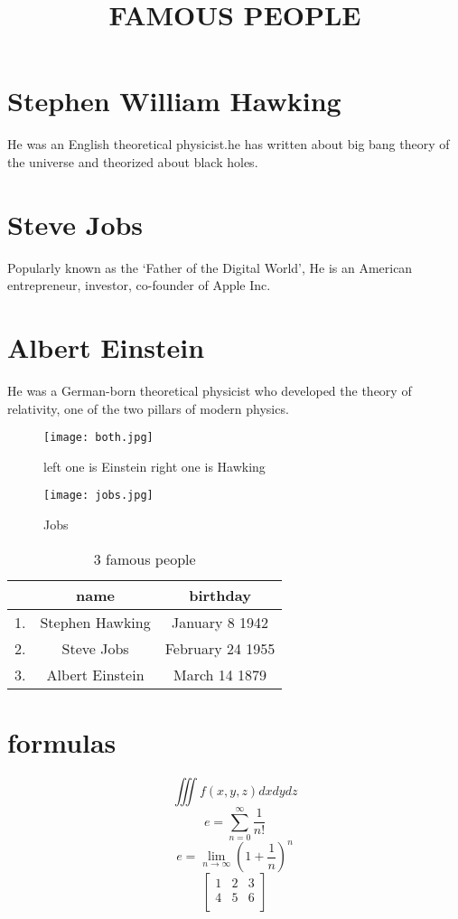 \documentclass[12pt]{article}
\begin{document}
\title{FAMOUS PEOPLE}
\maketitle

\section{Stephen William Hawking} 
He was an English theoretical physicist.he has written about big bang theory of the universe and theorized about black holes.

\section{Steve Jobs}
Popularly known as the ‘Father of the Digital World’, He is an American entrepreneur, investor, co-founder of Apple Inc. 
\section{Albert Einstein} He was a German-born theoretical physicist who developed the theory of relativity, one of the two pillars of modern physics.
\begin{figure}
\texttt{[image: both.jpg]}
\caption{left one is Einstein right one is Hawking}
\end{figure}
\begin{figure}

\texttt{[image: jobs.jpg]}
\caption{Jobs}
\end{figure}

\begin{table}[h!]
  \begin{center}
    \caption{3 famous people}
    \label{tab:table1}
    \begin{tabular}{|c|c|c|} 
    \hline
      \textbf{} & \textbf{name} & \textbf{birthday}\\
    
      \hline
      1. & Stephen Hawking & January 8 1942 \\
     \hline
      2. & Steve Jobs & February 24 1955\\
      \hline
      3. & Albert Einstein & March 14 1879\\
      \hline
    \end{tabular}
  \end{center}
\end{table}
\section{formulas}
$$\iiint f(x,y,z)dxdydz$$
$$e=\sum_{n=0}^{\infty}\frac{1}{n!}$$
$$ e=\lim_{n\to\infty}\left(1+\frac{1}{n}\right)^n$$
$$\begin{bmatrix}
1&2&3\\
4&5&6\\
\end{bmatrix}$$
\end{document}

